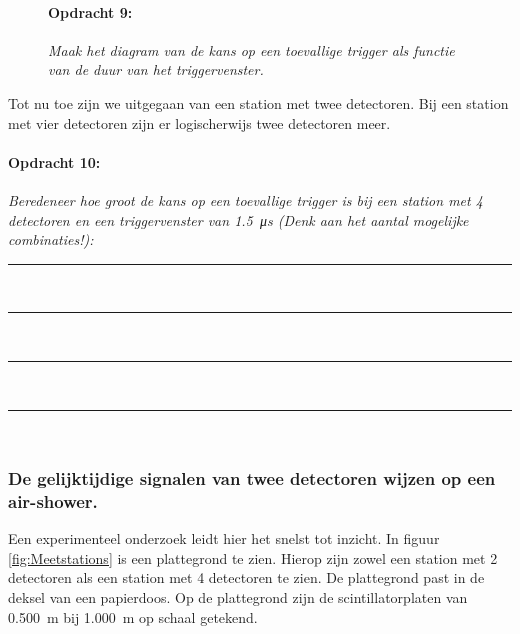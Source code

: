 \bigskip{}


\begin{figure}[ht]
    \paragraph{Opdracht 9:}

    \textit{Maak het diagram van de kans op een toevallige trigger als
    functie van de duur van het triggervenster.\bigskip{}}

\end{figure}


\bigskip{}


Tot nu toe zijn we uitgegaan van een station met twee detectoren.
Bij een station met vier detectoren zijn er logischerwijs twee detectoren
meer.

\begin{minipage}[t]{1\columnwidth}%

\paragraph{Opdracht 10:}

\textit{Beredeneer hoe groot de kans op een toevallige trigger is
bij een station met 4 detectoren en een triggervenster van \SI{1.5}{\micro\second}
(Denk aan het aantal mogelijke combinaties!):}

\begin{center}
    \rule{\textwidth}{0.3mm}\\
    \rule{\textwidth}{0.3mm}\\
    \rule{\textwidth}{0.3mm}\\
    \rule{\textwidth}{0.3mm}\\
\end{center}
\end{minipage}

\bigskip{}

\subsubsection{De gelijktijdige signalen van twee detectoren wijzen op
               een air-shower.}

Een experimenteel onderzoek leidt hier het snelst tot inzicht. In
figuur \ref{fig:Meetstations} is een plattegrond te zien. Hierop
zijn zowel een station met 2 detectoren als een station met 4 detectoren
te zien. De plattegrond past in de deksel van een papierdoos. Op de
plattegrond zijn de scintillatorplaten van \SI{0.500}{\meter} bij
\SI{1.000}{\meter} op schaal getekend. 

